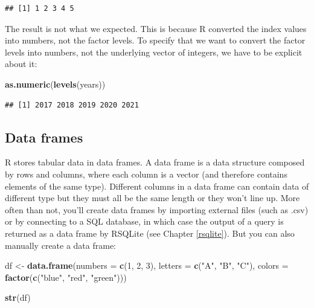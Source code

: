 \documentclass[
]{book}
\newenvironment{Shaded}{\begin{snugshade}}{\end{snugshade}}
\newcommand{\AttributeTok}[1]{\textcolor[rgb]{0.13,0.29,0.53}{#1}}
\newcommand{\DecValTok}[1]{\textcolor[rgb]{0.00,0.00,0.81}{#1}}
\newcommand{\FunctionTok}[1]{\textcolor[rgb]{0.13,0.29,0.53}{\textbf{#1}}}
\newcommand{\NormalTok}[1]{#1}
\newcommand{\OtherTok}[1]{\textcolor[rgb]{0.56,0.35,0.01}{#1}}
\newcommand{\StringTok}[1]{\textcolor[rgb]{0.31,0.60,0.02}{#1}}
\begin{document}
\begin{verbatim}
## [1] 1 2 3 4 5
\end{verbatim}

The result is not what we expected. This is because R converted the index values
into numbers, not the factor levels. To specify that we want to convert the
factor levels into numbers, not the underlying vector of integers, we have to be
explicit about it:

\begin{Shaded}
\begin{Highlighting}[]
\FunctionTok{as.numeric}\NormalTok{(}\FunctionTok{levels}\NormalTok{(years))}
\end{Highlighting}
\end{Shaded}

\begin{verbatim}
## [1] 2017 2018 2019 2020 2021
\end{verbatim}

\hypertarget{data-frames}{%
\subsection{Data frames}\label{data-frames}}

R stores tabular data in data frames. A data frame is a data structure composed
by rows and columns, where each column is a vector (and therefore contains
elements of the same type). Different columns in a data frame can contain data
of different type but they must all be the same length or they won't line up.
More often than not, you'll create data frames by importing external files (such
as .csv) or by connecting to a SQL database, in which case the output of a query
is returned as a data frame by RSQLite (see Chapter \ref{rsqlite}). But you can
also manually create a data frame:

\begin{Shaded}
\begin{Highlighting}[]
\NormalTok{df }\OtherTok{\textless{}{-}} \FunctionTok{data.frame}\NormalTok{(}\AttributeTok{numbers =} \FunctionTok{c}\NormalTok{(}\DecValTok{1}\NormalTok{, }\DecValTok{2}\NormalTok{, }\DecValTok{3}\NormalTok{),}
                 \AttributeTok{letters =} \FunctionTok{c}\NormalTok{(}\StringTok{"A"}\NormalTok{, }\StringTok{"B"}\NormalTok{, }\StringTok{"C"}\NormalTok{),}
                 \AttributeTok{colors =} \FunctionTok{factor}\NormalTok{(}\FunctionTok{c}\NormalTok{(}\StringTok{"blue"}\NormalTok{, }\StringTok{"red"}\NormalTok{, }\StringTok{"green"}\NormalTok{)))}

\FunctionTok{str}\NormalTok{(df)}
\end{Highlighting}
\end{Shaded}
\end{document}
